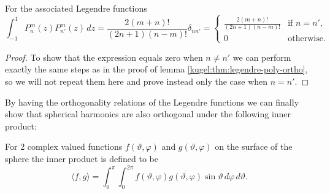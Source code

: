 \begin{lemma} For the associated Legendre functions
  \label{kugel:thm:associated-legendre-ortho}
  \begin{equation*}
    \int_{-1}^1 P^m_n(z) P^{m}_{n'}(z) \, dz
    = \frac{2(m + n)!}{(2n + 1)(n - m)!} \delta_{nn'}
    = \begin{cases}
      \frac{2(m + n)!}{(2n + 1)(n - m)!}
        & \text{if } n = n', \\
      0 & \text{otherwise}.
    \end{cases}
  \end{equation*}
\end{lemma}
\begin{proof}
  To show that the expression equals zero when $n \neq n'$ we can perform
  exactly the same steps as in the proof of lemma
  \ref{kugel:thm:legendre-poly-ortho}, so we will not repeat them here and prove
  instead only the case when $n = n'$.
\end{proof}

By having the orthogonality relations of the Legendre functions we can finally
show that spherical harmonics are also orthogonal under the following inner
product:

\begin{definition}
  \label{kugel:def:inner-product-s2}
  For 2 complex valued functions $f(\vartheta, \varphi)$ and $g(\vartheta,
  \varphi)$ on the surface of the sphere the inner product is defined to be
  \begin{equation*}
    \langle f, g \rangle
    = \int_{0}^\pi \int_0^{2\pi}
      f(\vartheta, \varphi) \overline{g(\vartheta, \varphi)}
      \sin \vartheta \, d\varphi \, d\vartheta.
  \end{equation*}
\end{definition}


